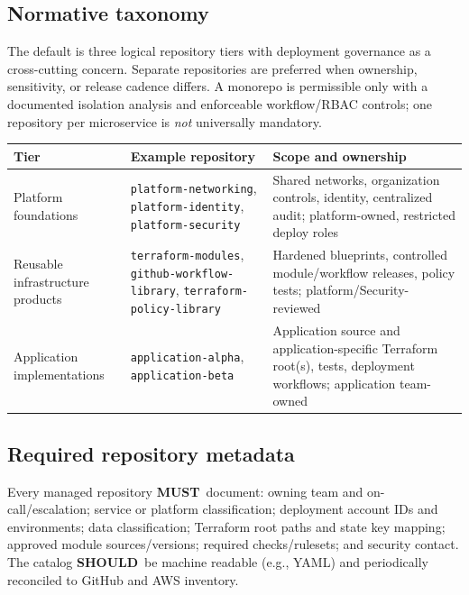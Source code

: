 \documentclass[10pt,letterpaper]{article}
\newcommand{\must}{\textbf{MUST}}
\newcommand{\should}{\textbf{SHOULD}}
\begin{document}
\subsection{Normative taxonomy}
The default is three logical repository tiers with deployment governance as a cross-cutting concern. Separate repositories are preferred when ownership, sensitivity, or release cadence differs. A monorepo is permissible only with a documented isolation analysis and enforceable workflow/RBAC controls; one repository per microservice is \emph{not} universally mandatory.
\begin{center}\small\begin{tabularx}{\linewidth}{@{}>{\raggedright\arraybackslash}p{30mm}>{\raggedright\arraybackslash}p{43mm}>{\raggedright\arraybackslash}X@{}}\toprule
Tier & Example repository & Scope and ownership\\\midrule
Platform foundations & \texttt{platform-networking}, \texttt{platform-identity}, \texttt{platform-security} & Shared networks, organization controls, identity, centralized audit; platform-owned, restricted deploy roles\\
Reusable infrastructure products & \texttt{terraform-modules}, \texttt{github-workflow-library}, \texttt{terraform-policy-library} & Hardened blueprints, controlled module/workflow releases, policy tests; platform/Security-reviewed\\
Application implementations & \texttt{application-alpha}, \texttt{application-beta} & Application source and application-specific Terraform root(s), tests, deployment workflows; application team-owned\\\bottomrule
\end{tabularx}\end{center}
\subsection{Required repository metadata}
Every managed repository \must\ document: owning team and on-call/escalation; service or platform classification; deployment account IDs and environments; data classification; Terraform root paths and state key mapping; approved module sources/versions; required checks/rulesets; and security contact. The catalog \should\ be machine readable (e.g., YAML) and periodically reconciled to GitHub and AWS inventory.
\end{document}
